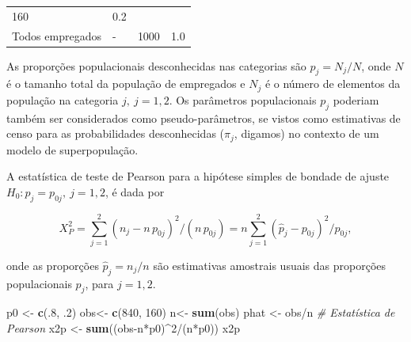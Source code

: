 \documentclass[]{book}
\newenvironment{Shaded}{\begin{snugshade}}{\end{snugshade}}
\newcommand{\KeywordTok}[1]{\textcolor[rgb]{0.13,0.29,0.53}{\textbf{{#1}}}}
\newcommand{\DecValTok}[1]{\textcolor[rgb]{0.00,0.00,0.81}{{#1}}}
\newcommand{\StringTok}[1]{\textcolor[rgb]{0.31,0.60,0.02}{{#1}}}
\newcommand{\CommentTok}[1]{\textcolor[rgb]{0.56,0.35,0.01}{\textit{{#1}}}}
\newcommand{\NormalTok}[1]{{#1}}
\numberwithin{example}{chapter}
\numberwithin{remark}{chapter}
\numberwithin{definition}{chapter}
\begin{document}
\begin{longtable}[]{@{}llll@{}}
\begin{minipage}[t]{0.07\columnwidth}
160\strut
\end{minipage} & \begin{minipage}[t]{0.11\columnwidth}\raggedright\strut
0.2\strut
\end{minipage}\tabularnewline
\begin{minipage}[t]{0.23\columnwidth}\raggedright\strut
Todos empregados\strut
\end{minipage} & \begin{minipage}[t]{0.05\columnwidth}\raggedright\strut
-\strut
\end{minipage} & \begin{minipage}[t]{0.07\columnwidth}\raggedright\strut
1000\strut
\end{minipage} & \begin{minipage}[t]{0.11\columnwidth}\raggedright\strut
1.0\strut
\end{minipage}\tabularnewline
\bottomrule
\end{longtable}

As proporções populacionais desconhecidas nas categorias são
\(p_{j}=N_{j}/N\), onde \(N\) é o tamanho total da população de
empregados e \(N_{j}\) é o número de elementos da população na categoria
\(j,\ j=1,2\). Os parâmetros populacionais \(p_{j}\) poderiam também ser
considerados como pseudo-parâmetros, se vistos como estimativas de censo
para as probabilidades desconhecidas (\(\pi _{j}\), digamos) no contexto
de um modelo de superpopulação.

A estatística de teste de Pearson para a hipótese simples de bondade de
ajuste \(H_{0}:p_{j}=p_{0j},\ j=1,2\), é dada por

\begin{equation}
X_{P}^{2}=\sum\limits_{j=1}^{2}\left( n_{j}-n\,p_{0j}\right)
^{2}/\left( n\,p_{0j}\right) =n\sum\limits_{j=1}^{2}\left( 
\widehat{p}_{j}-p_{0j}\right) ^{2}/p_{0j},  
\label{eq:qual1}
\end{equation}

onde as proporções \(\widehat{p}_{j}=n_{j}/n\) são estimativas amostrais
usuais das proporções populacionais \(p_{j}\), para \(j=1,2\).

\begin{Shaded}
\begin{Highlighting}[]
\NormalTok{p0 <-}\StringTok{ }\KeywordTok{c}\NormalTok{(.}\DecValTok{8}\NormalTok{, .}\DecValTok{2}\NormalTok{)}
\NormalTok{obs<-}\StringTok{ }\KeywordTok{c}\NormalTok{(}\DecValTok{840}\NormalTok{, }\DecValTok{160}\NormalTok{)}
\NormalTok{n<-}\StringTok{ }\KeywordTok{sum}\NormalTok{(obs)}
\NormalTok{phat <-}\StringTok{ }\NormalTok{obs/n}
\CommentTok{# Estatística de Pearson}
\NormalTok{x2p <-}\StringTok{ }\KeywordTok{sum}\NormalTok{((obs-n*p0)^}\DecValTok{2}\NormalTok{/(n*p0))}
\NormalTok{x2p}
\end{Highlighting}
\end{Shaded}
\end{document}

